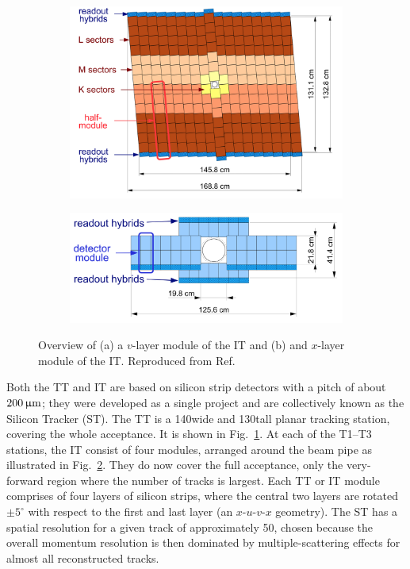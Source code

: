 \begin{figure}[tb]
    \centering
    \begin{subfigure}{0.55\columnwidth}
        \includegraphics[width=\columnwidth]{figures/detector/TT_station.png}
        \caption{\label{fig:TT_station}}
    \end{subfigure}
    \begin{subfigure}{0.42\columnwidth}
        \includegraphics[width=\columnwidth]{figures/detector/IT_station.png}
        \caption{\label{fig:IT_station}}
    \end{subfigure}
    \caption{Overview of (a) a $v$-layer module of the IT and (b) and $x$-layer module of the IT. Reproduced from Ref.~\cite{LHCb-detector}}
    \label{fig:TT_IT_stations}
\end{figure}

Both the TT and IT are based on silicon strip detectors with a pitch of about $200\,\upmu\text{m}$; they were developed as a single project and are collectively known as the Silicon Tracker (ST). The TT  is a 140\cm wide and 130\cm tall planar tracking station, covering the whole \lhcb acceptance. It is shown in Fig.~\ref{fig:TT_station}. At each of the T1--T3 stations,  the IT consist of four modules, arranged around the beam pipe as illustrated in Fig.~\ref{fig:IT_station}. They do now cover the full \lhcb acceptance, only the very-forward region where the number of tracks is largest. Each TT or IT module comprises of four layers of silicon strips, where the central two layers are rotated $\pm5^\circ$ with respect to the first and last layer (an $x$-$u$-$v$-$x$ geometry). The ST has a spatial resolution for a given track of approximately 50\mum, chosen because the overall momentum resolution is then dominated by multiple-scattering effects for almost all reconstructed tracks.

